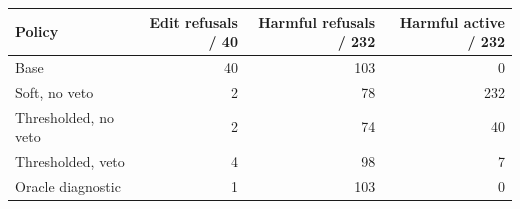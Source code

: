 \begin{tabular}{@{}lrrr@{}}
\toprule
Policy & Edit refusals / 40 & Harmful refusals / 232 & Harmful active / 232 \\
\midrule
Base & 40 & 103 & 0 \\
Soft, no veto & 2 & 78 & 232 \\
Thresholded, no veto & 2 & 74 & 40 \\
Thresholded, veto & 4 & 98 & 7 \\
Oracle diagnostic & 1 & 103 & 0 \\
\bottomrule
\end{tabular}
